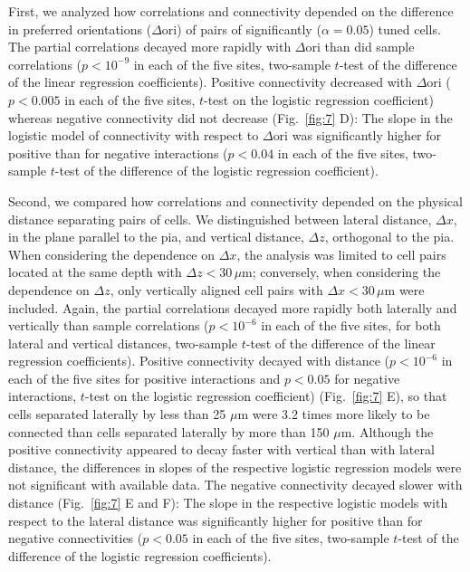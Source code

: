 First, we analyzed how correlations and connectivity depended on the difference in preferred orientations ($\Delta \mbox{ori}$) of pairs of significantly ($\alpha=0.05$) tuned cells. The partial correlations decayed more rapidly with $\Delta\mbox{ori}$ than did sample correlations ($p<10^{-9}$ in each of the five sites, two-sample $t$-test of the difference of the linear regression coefficients). Positive connectivity decreased with $\Delta\mbox{ori}$ ($p<0.005$ in each of the five sites, $t$-test on the logistic regression coefficient) whereas negative connectivity did not decrease (Fig.~\ref{fig:7} D): The slope in the logistic model of connectivity with respect to $\Delta\mbox{ori}$ was significantly higher for positive than for negative interactions ($p<0.04$ in each of the five sites, two-sample $t$-test of the difference of the logistic regression coefficient).

Second, we compared how correlations and connectivity depended on the physical distance separating pairs of cells. We distinguished between lateral distance, $\Delta x$, in the plane parallel to the pia, and vertical distance, $\Delta z$, orthogonal to the pia.  When considering the dependence on $\Delta x$, the analysis was limited to cell pairs located at the same depth with $\Delta z < 30\,\mu\mbox{m}$; conversely, when considering the dependence on $\Delta z$, only vertically aligned cell pairs with $\Delta x < 30\,\mu\mbox{m}$ were included. Again, the partial correlations decayed more rapidly both laterally and vertically than sample correlations ($p<10^{-6}$ in each of the five sites, for both lateral and vertical distances, two-sample $t$-test of the difference of the linear regression coefficients).
Positive connectivity decayed with distance ($p<10^{-6}$ in each of the five sites for positive interactions and $p<0.05$ for negative interactions, $t$-test on the logistic regression coefficient) (Fig.~\ref{fig:7} E), so that cells separated laterally by less than 25 $\mu\mbox{m}$ were 3.2 times more likely to be connected than cells separated laterally by more than 150 $\mu\mbox{m}$. Although the positive connectivity appeared to decay faster with vertical than with lateral distance, the differences in slopes of the respective logistic regression models were not significant with available data. The negative connectivity decayed slower with distance (Fig.~\ref{fig:7} E and F): The slope in the respective logistic models with respect to the lateral distance was significantly higher for positive than for negative connectivities ($p<0.05$ in each of the five sites, two-sample $t$-test of the difference of the logistic regression coefficients).
